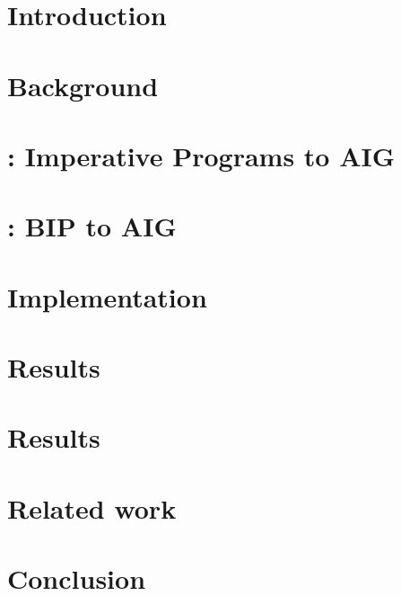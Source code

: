 \chapter{Introduction} \label{chap:intro}


\chapter{Background} \label{chap:back}


\chapter{\mytool: Imperative Programs to AIG} \label{chap:c2aig}


\chapter{\biptool: BIP to AIG} \label{chap:bip2aig}


\chapter{Implementation} \label{chap:implementation}


\chapter{\mytool{} Results} \label{chap:results}


\chapter{\biptool{} Results} \label{chap:bipresults}


\chapter{Related work} \label{chap:related}


\chapter{Conclusion} \label{chap:conclusion}


